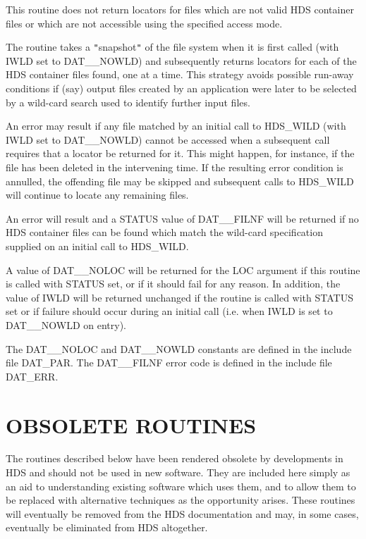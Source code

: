 \documentclass[11pt]{article}
\newcommand{\xlabel}[1]{}
\newcommand{\qt}[1]{``#1''}
\renewcommand{\qt}[1]{{\tt{"}}#1{\tt{"}}}
\begin{document}
{{{         \sstitem
         This routine does not return locators for files which are not
         valid HDS container files or which are not accessible using the
         specified access mode.

         \sstitem
         The routine takes a \qt{snapshot} of the file system when it is
         first called (with IWLD set to DAT\_\_NOWLD) and subsequently
         returns locators for each of the HDS container files found, one
         at a time. This strategy avoids possible run-away conditions if
         (say) output files created by an application were later to be
         selected by a wild-card search used to identify further input
         files.

         \sstitem
         An error may result if any file matched by an initial call to
         HDS\_WILD (with IWLD set to DAT\_\_NOWLD) cannot be accessed when a
         subsequent call requires that a locator be returned for it. This
         might happen, for instance, if the file has been deleted in the
         intervening time. If the resulting error condition is annulled,
         the offending file may be skipped and subsequent calls to
         HDS\_WILD will continue to locate any remaining files.

         \sstitem
         An error will result and a STATUS value of DAT\_\_FILNF will be
         returned if no HDS container files can be found which match the
         wild-card specification supplied on an initial call to HDS\_WILD.

         \sstitem
         A value of DAT\_\_NOLOC will be returned for the LOC argument if
         this routine is called with STATUS set, or if it should fail for
         any reason. In addition, the value of IWLD will be returned
         unchanged if the routine is called with STATUS set or if failure
         should occur during an initial call (i.e. when IWLD is set to
         DAT\_\_NOWLD on entry).

         \sstitem
         The DAT\_\_NOLOC and DAT\_\_NOWLD constants are defined in the
         include file DAT\_PAR. The DAT\_\_FILNF error code is defined in the
         include file DAT\_ERR.
      }
   }
}
\normalsize

\newpage
\section{\xlabel{obsolete_routines}OBSOLETE ROUTINES}
The routines described below have been rendered obsolete by
developments in HDS and should not be used in new software. They are
included here simply as an aid to understanding existing software
which uses them, and to allow them to be replaced with alternative
techniques as the opportunity arises. These routines will eventually
be removed from the HDS documentation and may, in some cases,
eventually be eliminated from HDS altogether.
\end{document}
